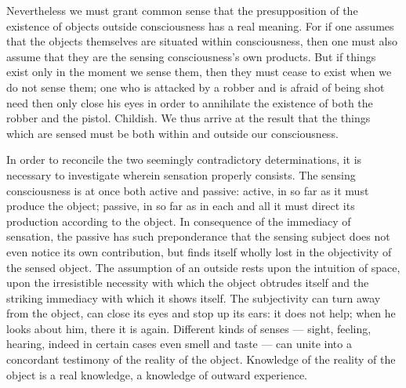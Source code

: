 \documentclass[12pt]{book}
\begin{document}
Nevertheless we must grant common sense that the presupposition of the
existence of objects outside consciousness has a real meaning. For if one
assumes that the objects themselves are situated within consciousness, then
one must also assume that they are the sensing consciousness's own products.
But if things exist only in the moment we sense them, then they must cease to
exist when we do not sense them; one who is attacked by a robber and is afraid
of being shot need then only close his eyes in order to annihilate the
existence of both the robber and the pistol. Childish. We thus arrive at the
result that the things which are sensed must be both within and outside our
consciousness.

In order to reconcile the two seemingly contradictory determinations, it is
necessary to investigate wherein sensation properly consists. The sensing
consciousness is at once both active and passive: active, in so far as it must
produce the object; passive, in so far as in each and all it must direct its
production according to the object. In consequence of the immediacy of
sensation, the passive has such preponderance that the sensing subject does
not even notice its own contribution, but finds itself wholly lost in the
objectivity of the sensed object. The assumption of an outside rests upon the
intuition of space, upon the irresistible necessity with which the object
obtrudes itself and the striking immediacy with which it shows itself. The
subjectivity can turn away from the object, can close its eyes and stop up its
ears: it does not help; when he looks about him, there it is again.
Different kinds of senses --- sight, feeling, hearing, indeed in certain cases
even smell and taste --- can unite into a concordant testimony of the reality
of the object. Knowledge of the reality of the object is a real knowledge, a
knowledge of outward experience.
\end{document}
